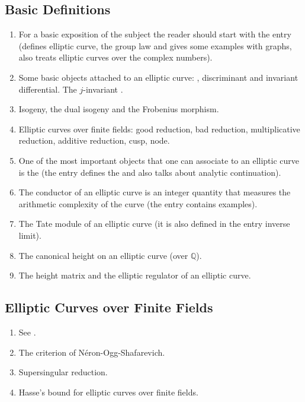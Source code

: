 \documentclass[12pt]{article}
\newcommand{\Rats}{\mathbb{Q}}
\begin{document}
\subsection{Basic Definitions}
\begin{enumerate}
\item For a basic exposition of the subject the reader should start with the entry  (defines elliptic curve, the group law and gives some examples with graphs, also treats elliptic curves over the complex numbers).

\item Some basic objects attached to an elliptic curve: , discriminant and invariant differential. The $j$-invariant .

\item Isogeny, the dual isogeny and the Frobenius morphism.

\item Elliptic curves over finite fields: good reduction, bad reduction, multiplicative reduction, additive reduction, cusp, node.

\item One of the most important objects that one can associate to an elliptic curve is the  (the entry defines the  and also talks about analytic continuation).

\item The conductor of an elliptic curve is an integer quantity that measures the arithmetic complexity of the curve (the entry contains examples).

\item The Tate module of an elliptic curve (it is also defined in the entry inverse limit).

\item The canonical height on an elliptic curve (over $\Rats$).

\item The height matrix and the elliptic regulator of an elliptic curve.

\end{enumerate}
\subsection{Elliptic Curves over Finite Fields}
\begin{enumerate}
\item See .

\item The criterion of N\'eron-Ogg-Shafarevich.
\item Supersingular reduction.
\item Hasse's bound for elliptic curves over finite fields.
\end{enumerate}
\end{document}
